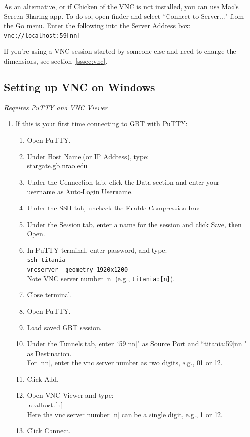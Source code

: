 \documentclass[11pt, reqno, tbtags]{article}
\begin{document}
\noindent As an alternative, or if Chicken of the VNC is not installed, you can use Mac's Screen Sharing app. To do so, open finder and select ``Connect to Server..." from the Go menu. Enter the following into the Server Address box: \\
\indent\texttt{vnc://localhost:59[nn]}

\noindent If you're using a VNC session started by someone else and need to change the dimensions, see section~\ref{sssec:vnc}. 


\subsection{Setting up VNC on Windows}\label{ssec:vncw}
\textit{Requires PuTTY and VNC Viewer} 
\begin{enumerate}
 \item If this is your first time connecting to GBT with PuTTY: 
 \begin{enumerate}
  \item Open PuTTY. 
  \item Under Host Name (or IP Address), type: \\
  stargate.gb.nrao.edu
  \item Under the Connection tab, click the Data section and enter your username as Auto-Login Username.
  \item Under the SSH tab, uncheck the Enable Compression box.
  \item Under the Session tab, enter a name for the session and click Save, then Open. 
  \item\label{st:nec} In PuTTY terminal, enter password, and type: \\
  \texttt{ssh titania\\                                 
  vncserver -geometry 1920x1200}\\
  Note VNC server number [n] (e.g., {\tt titania:[n]}).        
  \item Close terminal. 
  \item\label{st:op} Open PuTTY.
  \item Load saved GBT session.
  \item Under the Tunnels tab, enter ``59[nn]" as Source Port and ``titania:59[nn]" as Destination. \\          
  For [nn], enter the vnc server number as two digits, e.g., 01 or 12.
  \item Click Add.
  \item Open VNC Viewer and type:\\
  localhost:[n]\\
  Here the vnc server number [n] can be a single digit, e.g., 1 or 12. 
  \item Click Connect.
 \end{enumerate}



\end{enumerate}
\end{document}
